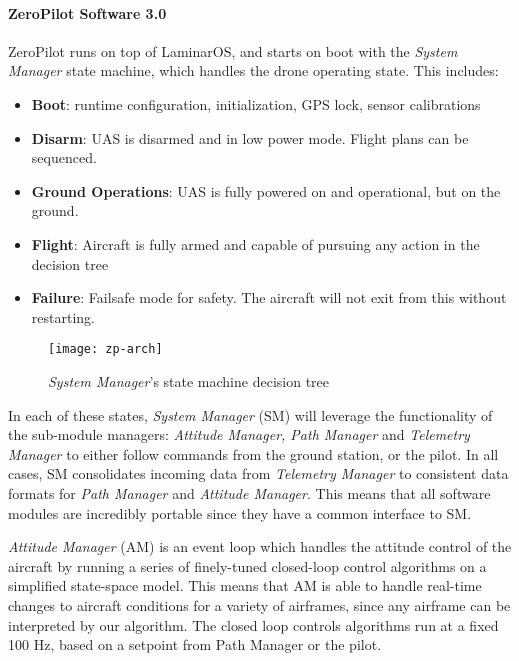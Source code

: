 \paragraph{ZeroPilot Software 3.0}

ZeroPilot runs on top of LaminarOS, and starts on boot with the \textit{System
Manager} state machine, which handles the drone operating state. This includes:

\begin{itemize}
    \item \textbf{Boot}: runtime configuration, initialization, GPS lock, sensor 
    calibrations

	\item \textbf{Disarm}: UAS is disarmed and in low power mode. Flight plans
		can be sequenced.

	\item \textbf{Ground Operations}: UAS is fully powered on and operational,
		but on the ground.

	\item \textbf{Flight}: Aircraft is fully armed and capable of pursuing any
		action in the decision tree

	\item \textbf{Failure}: Failsafe mode for safety. The aircraft will not
		exit from this without restarting.
\end{itemize}

\begin{figure}[H]
        \centering
        \texttt{[image: zp-arch]}
        \caption{\textit{System Manager}'s state machine decision tree}
\end{figure}

In each of these states, \textit{System Manager} (SM) will leverage the
functionality of the sub-module managers: \textit{Attitude Manager, Path
Manager} and \textit{Telemetry Manager} to either follow commands from the
ground station, or the pilot. In all cases, SM consolidates incoming data from
\textit{Telemetry Manager} to consistent data formats for \textit{Path Manager}
and \textit{Attitude Manager}. This means that all software modules are
incredibly portable since they have a common interface to SM.

\textit{Attitude Manager} (AM) is an event loop which handles the attitude
control of the aircraft by running a series of finely-tuned closed-loop control
algorithms on a simplified state-space model. This means that AM is able to
handle real-time changes to aircraft conditions for a variety of airframes,
since any airframe can be interpreted by our algorithm. The closed loop
controls algorithms run at a fixed 100 Hz, based on a setpoint from Path Manager
or the pilot.

